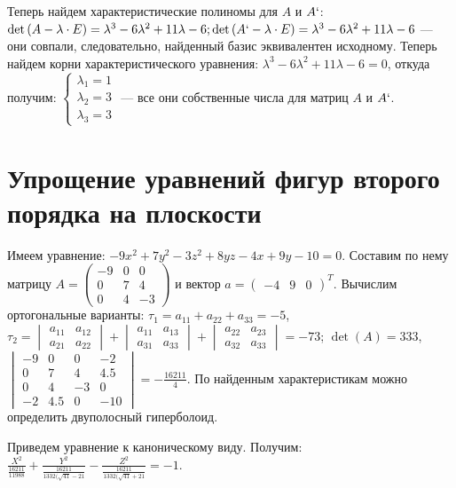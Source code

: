 \documentclass[14pt]{extreport}
\begin{document}
Теперь найдем характеристические полиномы для $A$ и $A`$: $\det{(A - \lambda\cdot E)} = \lambda^3 - 6\lambda^2 +
11\lambda - 6; \det{(A` - \lambda\cdot E)} = \lambda^3 - 6\lambda^2 + 11\lambda - 6$ --- они совпали, следовательно,
найденный базис эквивалентен исходному. Теперь найдем корни характеристического уравнения:
$\lambda^3 - 6\lambda^2 + 11\lambda - 6 = 0$, откуда получим: $\begin{cases}\lambda_1 = 1\\
\lambda_2 = 3\\\lambda_3 = 3\end{cases}$ --- все они собственные числа для матриц $A$ и $A`$.

\section{Упрощение уравнений фигур второго порядка на плоскости}

Имеем уравнение: $-9x^2 + 7y^2 - 3z^2 + 8yz - 4x + 9y - 10 = 0$. Составим по нему матрицу $A = \begin{pmatrix}
-9&0&0\\0&7&4\\0&4&-3\end{pmatrix}$ и вектор $a = \begin{pmatrix}-4&9&0\end{pmatrix}^T$. Вычислим ортогональные варианты:
$\tau_1 = a_{11} + a_{22} + a_{33} = -5$, $\tau_2 = \begin{vmatrix}a_{11}&a_{12}\\a_{21}&a_{22}\end{vmatrix}
+ \begin{vmatrix}a_{11}&a_{13}\\a_{31}&a_{33}\end{vmatrix} + \begin{vmatrix}a_{22}&a_{23}\\a_{32}&a_{33}
\end{vmatrix} = -73$; $\det{(A)} = 333$, $\begin{vmatrix}-9&0&0&-2\\0&7&4&4.5\\
0&4&-3&0\\-2&4.5&0&-10\end{vmatrix} = -\frac{16211}{4}$. По найденным характеристикам можно определить двуполосный
гиперболоид.

Приведем уравнение к каноническому виду. Получим:
$\frac{X^2}{\frac{16211}{11988}} + \frac{Y^2}{\frac{16211}{1332(\sqrt{41} - 21}} - \frac{Z^2}{\frac{16211}{1332(\sqrt{41} + 21}} = -1$.
\end{document}
